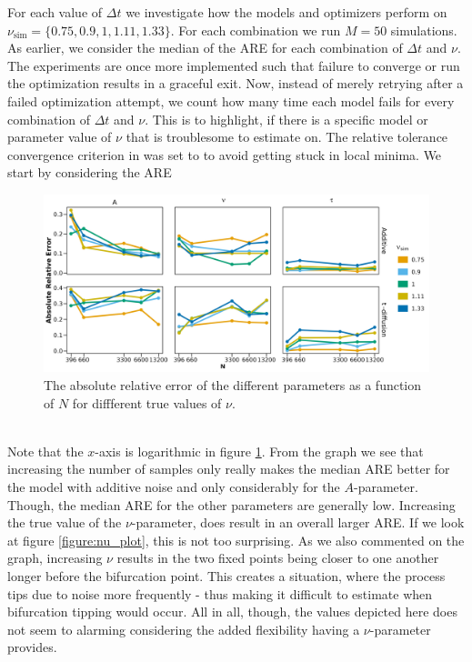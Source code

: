 For each value of $\Delta t$ we investigate how the models and optimizers perform on $\nu_{\mathrm{sim}} = \{0.75, 0.9, 1, 1.11, 1.33\}$. For each combination we run $M = 50$ simulations. As earlier, we consider the median of the ARE for each combination of $\Delta t$ and $\nu$. The experiments are once more implemented such that failure to converge or run the optimization results in a graceful exit. Now, instead of merely retrying after a failed optimization attempt, we count how many time each model fails for every combination of $\Delta t$ and $\nu$. This is to highlight, if there is a specific model or parameter value of $\nu$ that is troublesome to estimate on. The relative tolerance convergence criterion in  was set to  to avoid getting stuck in local minima. 
\newpage
\noindent We start by considering the ARE 
\begin{figure}[h!]
    \begin{center}
        \includegraphics[scale = .1]{figures/combined_nus_plot.jpeg}
        \caption{The absolute relative error of the different parameters as a function of $N$ for diffferent true values of $\nu$.}
        \label{figure:ARE_nu_plots}
    \end{center}
\end{figure}\\
Note that the $x$-axis is logarithmic in figure \ref{figure:ARE_nu_plots}. From the graph we see that increasing the number of samples only really makes the median ARE better for the model with additive noise and only considerably for the $A$-parameter. Though, the median ARE for the other parameters are generally low. Increasing the true value of the $\nu$-parameter, does result in an overall larger ARE. If we look at figure \ref{figure:nu_plot}, this is not too surprising. As we also commented on the graph, increasing $\nu$ results in the two fixed points being closer to one another longer before the bifurcation point. This creates a situation, where the process tips due to noise more frequently - thus making it difficult to estimate when bifurcation tipping would occur. All in all, though, the values depicted here does not seem to alarming considering the added flexibility having a $\nu$-parameter provides. 
